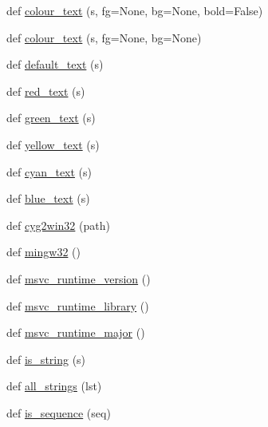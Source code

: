 \begin{DoxyCompactItemize}
\item 
def \hyperlink{namespacenumpy_1_1distutils_1_1misc__util_a3122ed1e325ffcc3296887006f8e4348}{colour\+\_\+text} (s, fg=None, bg=None, bold=False)
\item 
def \hyperlink{namespacenumpy_1_1distutils_1_1misc__util_a5d3f26d52d0e1848533c180da4333fb6}{colour\+\_\+text} (s, fg=None, bg=None)
\item 
def \hyperlink{namespacenumpy_1_1distutils_1_1misc__util_ac837079525c8c4bc26623c3acf7a638e}{default\+\_\+text} (s)
\item 
def \hyperlink{namespacenumpy_1_1distutils_1_1misc__util_a8680d8d2a417b564777817ac12e84c8b}{red\+\_\+text} (s)
\item 
def \hyperlink{namespacenumpy_1_1distutils_1_1misc__util_a03608f9a4dabe3bad62121c98eb2495b}{green\+\_\+text} (s)
\item 
def \hyperlink{namespacenumpy_1_1distutils_1_1misc__util_ae3db6c935450022ca42dcce3b11d81f5}{yellow\+\_\+text} (s)
\item 
def \hyperlink{namespacenumpy_1_1distutils_1_1misc__util_a82d5f78d6aa70eef211f3e5167bf1383}{cyan\+\_\+text} (s)
\item 
def \hyperlink{namespacenumpy_1_1distutils_1_1misc__util_a7a7d4f010ae173ae7dd3f283c8a96176}{blue\+\_\+text} (s)
\item 
def \hyperlink{namespacenumpy_1_1distutils_1_1misc__util_a7743a3aa8c3c87c5d57c7ba32d6376d6}{cyg2win32} (path)
\item 
def \hyperlink{namespacenumpy_1_1distutils_1_1misc__util_a990d59f383b59efaf50e0d9200ac6f18}{mingw32} ()
\item 
def \hyperlink{namespacenumpy_1_1distutils_1_1misc__util_aab3dae7aa280c80ae709d4279e64ba5f}{msvc\+\_\+runtime\+\_\+version} ()
\item 
def \hyperlink{namespacenumpy_1_1distutils_1_1misc__util_a17e39c7c316ccbd4ee27adcbe57a69f0}{msvc\+\_\+runtime\+\_\+library} ()
\item 
def \hyperlink{namespacenumpy_1_1distutils_1_1misc__util_a956bce2fa2c62c07d12199f385068dc2}{msvc\+\_\+runtime\+\_\+major} ()
\item 
def \hyperlink{namespacenumpy_1_1distutils_1_1misc__util_ab0ad655b3c5ba623cf6a233b75572de5}{is\+\_\+string} (s)
\item 
def \hyperlink{namespacenumpy_1_1distutils_1_1misc__util_a984628091178ee2038bd27e046983750}{all\+\_\+strings} (lst)
\item 
def \hyperlink{namespacenumpy_1_1distutils_1_1misc__util_af548f0c2a6084eca895ecdfb88612396}{is\+\_\+sequence} (seq)

\end{DoxyCompactItemize}
